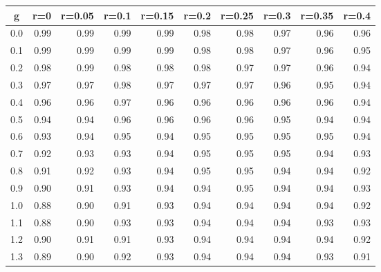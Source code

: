 %
\begin{table}[!tbp]
 \begin{center}
 \begin{tabular}{rrrrrrrrrr}\hline\hline
\multicolumn{1}{c}{g}&\multicolumn{1}{c}{r=0}&\multicolumn{1}{c}{r=0.05}&\multicolumn{1}{c}{r=0.1}&\multicolumn{1}{c}{r=0.15}&\multicolumn{1}{c}{r=0.2}&\multicolumn{1}{c}{r=0.25}&\multicolumn{1}{c}{r=0.3}&\multicolumn{1}{c}{r=0.35}&\multicolumn{1}{c}{r=0.4}\tabularnewline
\hline
0.0&0.99&0.99&0.99&0.99&0.98&0.98&0.97&0.96&0.96\tabularnewline
0.1&0.99&0.99&0.99&0.99&0.98&0.98&0.97&0.96&0.95\tabularnewline
0.2&0.98&0.99&0.98&0.98&0.98&0.97&0.97&0.96&0.94\tabularnewline
0.3&0.97&0.97&0.98&0.97&0.97&0.97&0.96&0.95&0.94\tabularnewline
0.4&0.96&0.96&0.97&0.96&0.96&0.96&0.96&0.96&0.94\tabularnewline
0.5&0.94&0.94&0.96&0.96&0.96&0.96&0.95&0.94&0.94\tabularnewline
0.6&0.93&0.94&0.95&0.94&0.95&0.95&0.95&0.95&0.94\tabularnewline
0.7&0.92&0.93&0.93&0.94&0.95&0.95&0.95&0.94&0.93\tabularnewline
0.8&0.91&0.92&0.93&0.94&0.95&0.95&0.94&0.94&0.92\tabularnewline
0.9&0.90&0.91&0.93&0.94&0.94&0.95&0.94&0.94&0.93\tabularnewline
1.0&0.88&0.90&0.91&0.93&0.94&0.94&0.94&0.94&0.92\tabularnewline
1.1&0.88&0.90&0.93&0.93&0.94&0.94&0.94&0.93&0.93\tabularnewline
1.2&0.90&0.91&0.91&0.93&0.94&0.94&0.94&0.94&0.92\tabularnewline
1.3&0.89&0.90&0.92&0.93&0.94&0.94&0.94&0.93&0.91\tabularnewline
\hline
\end{tabular}

\end{center}

\end{table}

